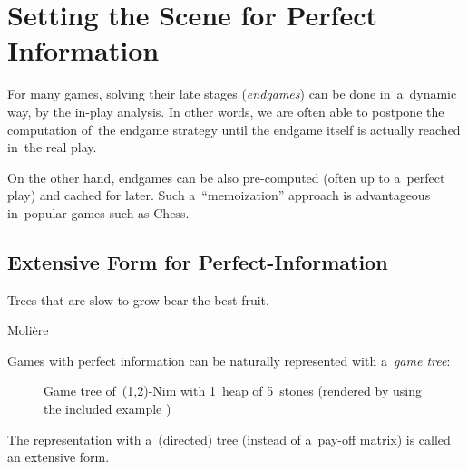 \chapter{Setting the Scene for Perfect Information}
\label{ch:perf-intro}
For many games, solving their late stages (\emph{endgames}) can be done in~a~dynamic way, by the in-play analysis.
In other words, we are often able to postpone the computation of~the endgame strategy until the endgame itself is actually reached in~the real play.

On the other hand, endgames can be also pre-computed (often up to a~perfect play) and cached for later.
Such a~``memoization'' approach is advantageous in~popular games such as Chess.

\section{Extensive Form for Perfect-Information}
\label{sec:extensive-form-perf-info}
\epigraph{Trees that are slow to grow bear the best fruit.}
{Molière}
Games with perfect information can be naturally represented with a~\emph{game tree}:
\begin{figure}[H]
  \centering
  \scriptsize
  \def\svgwidth{.9\textwidth}
  
  \def\captionTitle{Game tree of~(1,2)-Nim with 1~heap of 5~stones}
  \caption[\captionTitle]{\captionTitle{} (rendered by  using the included example )}
  \label{fig:game-tree-nim-5}
\end{figure}
\noindent
The representation with a~(directed) tree (instead of a~pay-off matrix) is called an extensive form.

